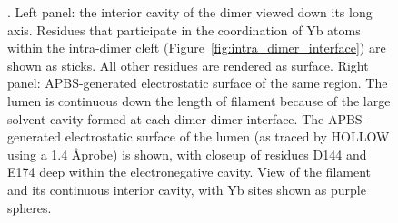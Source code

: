\begin{figure}[hp]
\caption[The electronegative lumen within the cardiac calsequestrin filament]{\textbf{\headingsubsectionsix}. \figurepanelcaptiona Left panel: the interior cavity of the dimer viewed down its long axis. Residues that participate in the coordination of Yb atoms within the intra-dimer cleft (Figure~\ref{fig:intra_dimer_interface}) are shown as sticks. All other residues are rendered as surface. Right panel: APBS-generated electrostatic surface of the same region. \figurepanelcaptionb The lumen is continuous down the length of filament because of the large solvent cavity formed at each dimer-dimer interface. The APBS-generated electrostatic surface of the lumen (as traced by HOLLOW using a 1.4 \AA probe) is shown, with closeup of residues D144 and E174 deep within the electronegative cavity. \figurepanelcaptionc View of the filament and its continuous interior cavity, with Yb sites shown as purple spheres.}
\label{fig:filament_cavity}
\end{figure}
\restoregeometry